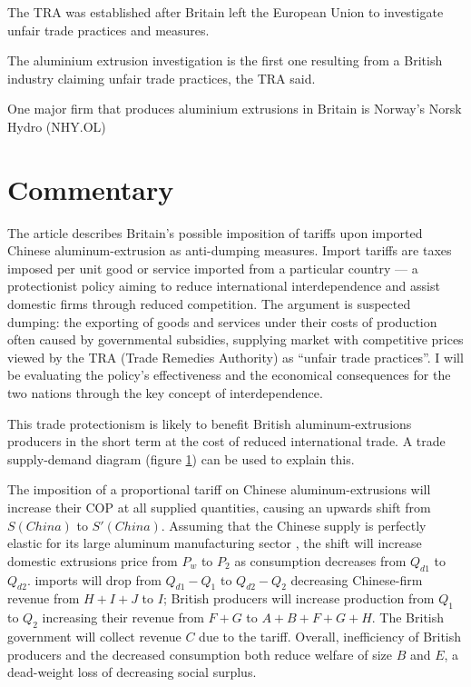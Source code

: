 \documentclass[a4paper,12pt]{article}
\newcommand{\tikzfig}[1]{}
\begin{document}
The TRA was established after Britain left the European Union to investigate unfair trade practices and measures.

The aluminium extrusion investigation is the first one resulting from a British industry claiming unfair trade practices, the TRA said.

One major firm that produces aluminium extrusions in Britain is Norway's Norsk Hydro (NHY.OL)

\newpage
\section*{Commentary}


The article describes Britain's possible imposition of tariffs upon imported Chinese aluminum-extrusion as anti-dumping measures. Import tariffs are taxes imposed per unit good or service imported from a particular country --- a protectionist policy aiming to reduce international interdependence and assist domestic firms through reduced competition. The argument is suspected dumping: the exporting of goods and services under their costs of production often caused by governmental subsidies, supplying market with competitive prices viewed by the TRA (Trade Remedies Authority) as ``unfair trade practices''. I will be evaluating the policy's effectiveness and the economical consequences for the two nations through the key concept of interdependence.

This trade protectionism is likely to benefit British aluminum-extrusions producers in the short term at the cost of reduced international trade. A trade supply-demand diagram (figure \ref{fig:tariff}) can be used to explain this.

\begin{figure}[H]
	\centering
	 \tikzfig{assets/tariffs.txt}
	\caption{}
	\label{fig:tariff}
\end{figure}

The imposition of a proportional tariff on Chinese aluminum-extrusions will increase their COP at all supplied quantities, causing an upwards shift from $S(China)$ to $S'(China)$. Assuming that the Chinese supply is perfectly elastic for its large aluminum manufacturing sector \parencite{ilzetzki_2022}, the shift will increase domestic extrusions price from $P_w$ to $P_2$ as consumption decreases from $Q_{d1}$ to $Q_{d2}$.
imports will drop from $Q_{d1}-Q_{1}$ to $Q_{d2}-Q_{2}$ decreasing Chinese-firm revenue from $H+I+J$ to $I$; British producers will increase production from $Q_1$ to $Q_2$ increasing their revenue from $F+G$ to $A+B+F+G+H$. The British government will collect revenue $C$ due to the tariff. Overall, inefficiency of British producers and the decreased consumption both reduce welfare of size $B$ and $E$, a dead-weight loss of decreasing social surplus.
\end{document}
